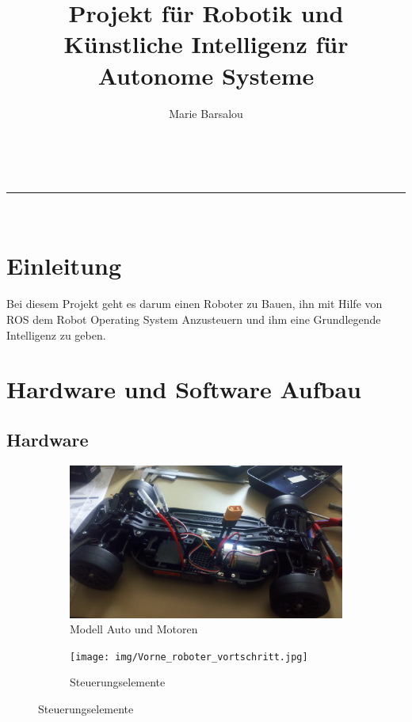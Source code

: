 \documentclass[a4paper,11pt]{article}
\makeatletter
\newcommand{\linia}{\rule{\linewidth}{0.5pt}}
\theoremstyle{mytheor}
\renewcommand{\maketitle}{
\begin{center}
\vspace{2ex}
{\huge \textsc{\@title}}
\vspace{1ex}
\\
\linia\\
\@author \hfill \@date
\vspace{4ex}
\end{center}
}
\makeatother
\begin{document}
\title{Projekt für Robotik und Künstliche Intelligenz für Autonome Systeme}

\author{Marie Barsalou}



\maketitle

\section*{Einleitung}

Bei diesem Projekt geht es darum einen Roboter zu Bauen, ihn mit Hilfe von ROS dem Robot Operating System Anzusteuern und ihm eine Grundlegende Intelligenz zu geben. 

\section{Hardware und Software Aufbau}

\subsection*{Hardware}

	\begin{figure}[h]
	\centering
	\begin{subfigure}[b]{0.4\linewidth}
	\includegraphics[width=\linewidth]{img/car_body.jpg}
	\caption{Modell Auto und Motoren}
	\label{fig1: Karosserie}
	\end{subfigure}
	\begin{subfigure}[b]{0.4\linewidth}
	\texttt{[image: img/Vorne\_roboter\_vortschritt.jpg]}
	\caption{Steuerungselemente}
	\label{fig2: Raspi}
	\end{subfigure}
\end{figure}
\end{document}
